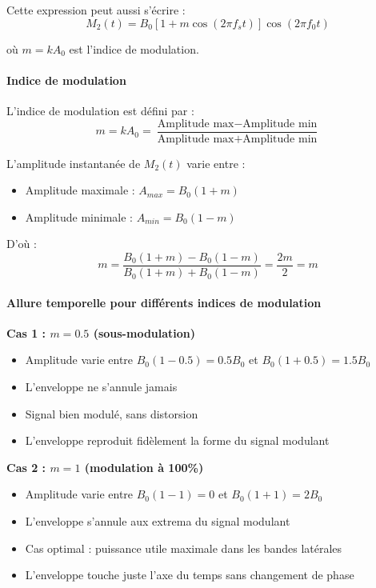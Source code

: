 \documentclass[11pt,a4paper]{article}
\begin{document}
Cette expression peut aussi s'écrire :
\begin{equation}
M_2(t) = B_0[1 + m \cos(2\pi f_s t)] \cos(2\pi f_0 t)
\end{equation}

où $m = k A_0$ est l'indice de modulation.

\paragraph{Indice de modulation}

L'indice de modulation est défini par :
\begin{equation}
\boxed{m = k A_0 = \frac{\text{Amplitude max} - \text{Amplitude min}}{\text{Amplitude max} + \text{Amplitude min}}}
\end{equation}

L'amplitude instantanée de $M_2(t)$ varie entre :
\begin{itemize}
    \item Amplitude maximale : $A_{max} = B_0(1 + m)$
    \item Amplitude minimale : $A_{min} = B_0(1 - m)$
\end{itemize}

D'où :
\begin{equation}
m = \frac{B_0(1+m) - B_0(1-m)}{B_0(1+m) + B_0(1-m)} = \frac{2m}{2} = m
\end{equation}

\paragraph{Allure temporelle pour différents indices de modulation}

\textbf{Cas 1 : $m = 0.5$ (sous-modulation)}

\begin{itemize}
    \item Amplitude varie entre $B_0(1-0.5) = 0.5 B_0$ et $B_0(1+0.5) = 1.5 B_0$
    \item L'enveloppe ne s'annule jamais
    \item Signal bien modulé, sans distorsion
    \item L'enveloppe reproduit fidèlement la forme du signal modulant
\end{itemize}

\textbf{Cas 2 : $m = 1$ (modulation à 100\%)}

\begin{itemize}
    \item Amplitude varie entre $B_0(1-1) = 0$ et $B_0(1+1) = 2 B_0$
    \item L'enveloppe s'annule aux extrema du signal modulant
    \item Cas optimal : puissance utile maximale dans les bandes latérales
    \item L'enveloppe touche juste l'axe du temps sans changement de phase
\end{itemize}
\end{document}
